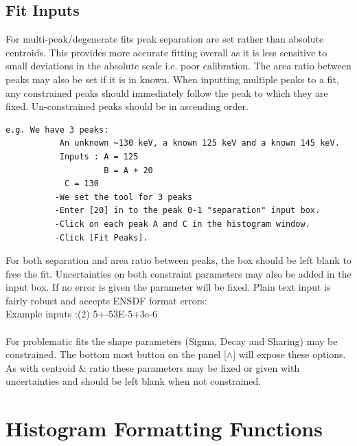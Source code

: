 \documentclass[a4paper,10pt]{article}
\begin{document}
\subsection{Fit Inputs}
For multi-peak/degenerate fits peak separation are set rather than absolute centroids. This provides more accurate fitting overall as it is less sensitive to small deviations in the absolute scale i.e. poor calibration. The area ratio between peaks may also be set if it is in known. When inputting multiple peaks to a fit, any constrained peaks should immediately follow the peak to which they are fixed. Un-constrained peaks should be in ascending order.
\begin{lstlisting}
e.g. We have 3 peaks:
           An unknown ~130 keV, a known 125 keV and a known 145 keV.
           Inputs : A = 125
                    B = A + 20
		    C = 130
          -We set the tool for 3 peaks
          -Enter [20] in to the peak 0-1 "separation" input box.
          -Click on each peak A and C in the histogram window.
          -Click [Fit Peaks].
\end{lstlisting}

For both separation and area ratio between peaks, the box should be left blank to free the fit. Uncertainties on both constraint parameters may also be added in the input box. If no error is given the parameter will be fixed. Plain text input is fairly robust and accepts ENSDF format errors:\\
Example inputs :(2) 5+-5\qquad3E-5+3e-6
\\
\\
For problematic fits the shape parameters (Sigma, Decay and Sharing) may be constrained. The bottom most button on the panel [$\wedge$] will expose these options. As with centroid \& ratio these parameters may be fixed or given with uncertainties and should be left blank when not constrained.

\section{Histogram Formatting Functions}
\end{document}
